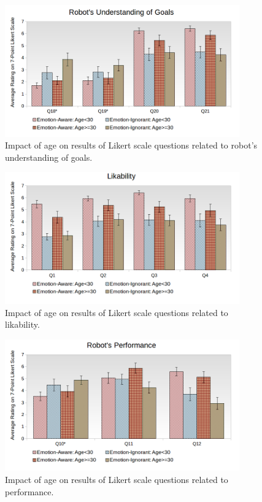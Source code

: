 \documentclass[12pt]{report}
\begin{document}
\begin{figure}[!h]
\centering
\includegraphics[width=0.9\textwidth]{figure/Age-Goals.png}
\caption{\fontsize{10pt}{10pt}\selectfont Impact of age on results of Likert
scale questions related to robot's understanding of goals.}
\label{fig:age-goals}
\vspace*{10mm}
\end{figure}

\begin{figure}[!h]
\centering
\vspace*{15mm}
\includegraphics[width=0.9\textwidth]{figure/Age-Likability.png}
\caption{\fontsize{10pt}{10pt}\selectfont Impact of age on results of Likert
scale questions related to likability.}
\label{fig:age-likability}
\end{figure}

\begin{figure}[!h]
\centering
\includegraphics[width=0.9\textwidth]{figure/Age-Performance.png}
\caption{\fontsize{10pt}{10pt}\selectfont Impact of age on results of Likert
scale questions related to performance.}
\label{fig:age-performance}
\vspace*{15mm}
\end{figure}
\end{document}
